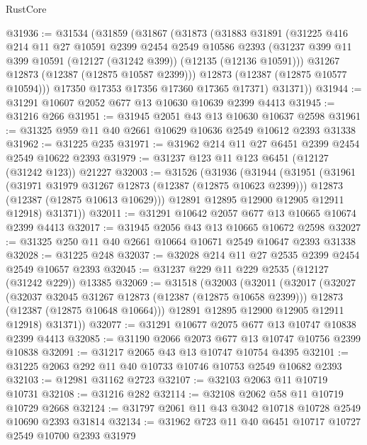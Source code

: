 \begin{lexlean}{RustCore}
\begin{coremodule}
@31936 := @31534
    (@31859
      (@31867
        (@31873
          (@31883
            @31891
            (@31225
              @416
              @214
              @11
              @27
              @10591
              @2399
              @2454
              @2549
              @10586
              @2393
              (@31237 @399 @11 @399 @10591 (@12127 (@31242 @399)) (@12135 (@12136 @10591)))
              @31267
              @12873
              (@12387 (@12875 @10587 @2399)))
            @12873
            (@12387 (@12875 @10577 @10594)))
          @17350
          @17353
          @17356
          @17360
          @17365
          @17371)
        @31371))
@31944 := @31291 @10607 @2052 @677 @13 @10630 @10639 @2399 @4413
@31945 := @31216 @266
@31951 := @31945 @2051 @43 @13 @10630 @10637 @2598
@31961 := @31325 @959 @11 @40 @2661 @10629 @10636 @2549 @10612 @2393 @31338
@31962 := @31225 @235
@31971 := @31962 @214 @11 @27 @6451 @2399 @2454 @2549 @10622 @2393
@31979 := @31237 @123 @11 @123 @6451 (@12127 (@31242 @123)) @21227
@32003 := @31526
    (@31936
      (@31944
        (@31951
          (@31961
            (@31971 @31979 @31267 @12873 (@12387 (@12875 @10623 @2399)))
            @12873
            (@12387 (@12875 @10613 @10629)))
          @12891
          @12895
          @12900
          @12905
          @12911
          @12918)
        @31371))
@32011 := @31291 @10642 @2057 @677 @13 @10665 @10674 @2399 @4413
@32017 := @31945 @2056 @43 @13 @10665 @10672 @2598
@32027 := @31325 @250 @11 @40 @2661 @10664 @10671 @2549 @10647 @2393 @31338
@32028 := @31225 @248
@32037 := @32028 @214 @11 @27 @2535 @2399 @2454 @2549 @10657 @2393
@32045 := @31237 @229 @11 @229 @2535 (@12127 (@31242 @229)) @13385
@32069 := @31518
    (@32003
      (@32011
        (@32017
          (@32027
            (@32037 @32045 @31267 @12873 (@12387 (@12875 @10658 @2399)))
            @12873
            (@12387 (@12875 @10648 @10664)))
          @12891
          @12895
          @12900
          @12905
          @12911
          @12918)
        @31371))
@32077 := @31291 @10677 @2075 @677 @13 @10747 @10838 @2399 @4413
@32085 := @31190 @2066 @2073 @677 @13 @10747 @10756 @2399 @10838
@32091 := @31217 @2065 @43 @13 @10747 @10754 @4395
@32101 := @31225 @2063 @292 @11 @40 @10733 @10746 @10753 @2549 @10682 @2393
@32103 := @12981 @31162 @2723
@32107 := @32103 @2063 @11 @10719 @10731
@32108 := @31216 @282
@32114 := @32108 @2062 @58 @11 @10719 @10729 @2668
@32124 := @31797 @2061 @11 @43 @3042 @10718 @10728 @2549 @10690 @2393 @31814
@32134 := @31962 @723 @11 @40 @6451 @10717 @10727 @2549 @10700 @2393 @31979

\end{coremodule}
\end{lexlean}
